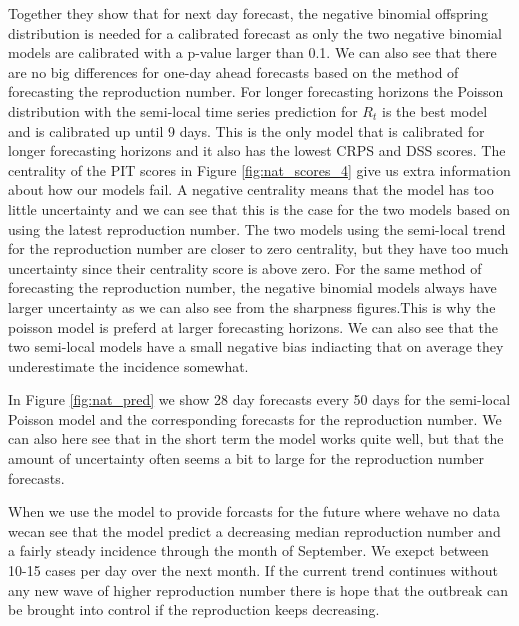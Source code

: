 \documentclass[12pt]{article}
\begin{document}
Together they show that for next day forecast, the negative binomial offspring distribution is needed for a calibrated forecast as only the two negative binomial models are calibrated with a p-value larger than 0.1. We can also see that there are no big differences for one-day ahead forecasts based on the method of forecasting the reproduction number. For longer forecasting horizons the Poisson distribution with the semi-local time series prediction for $R_t$ is the best model and is calibrated up until 9 days. This is the only model that is calibrated for longer forecasting horizons and it also has the lowest CRPS and DSS scores. The centrality of the PIT scores in Figure \ref{fig:nat_scores_4} give us extra information about how our models fail. A negative centrality means that the model has too little uncertainty and we can see that this is the case for the two models based on using the latest reproduction number. The two models using the semi-local trend for the reproduction number are closer to zero centrality, but they have too much uncertainty since their centrality score is above zero. For the same method of forecasting the reproduction number, the negative binomial models always have larger uncertainty as we can also see from the sharpness figures.This is why the poisson model is preferd at larger forecasting horizons. We can also see that the two semi-local models have a small negative bias indiacting that on average they underestimate the incidence somewhat.

In Figure \ref{fig:nat_pred} we show 28 day forecasts every 50 days for the semi-local Poisson model and the corresponding forecasts for the reproduction number. We can also here see that in the short term the model works quite well, but that the amount of uncertainty often seems a bit to large for the reproduction number forecasts. 

When we use the model to provide forcasts for the future where wehave no data wecan see that the model predict a decreasing median reproduction number and a fairly steady incidence through the month of September. We exepct between 10-15 cases per day over the next month. If the current trend continues without any new wave of higher reproduction number there is hope that the outbreak can be brought into control if the reproduction keeps decreasing. 
\end{document}
